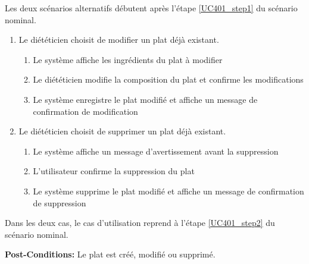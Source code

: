 Les deux scénarios alternatifs débutent après l'étape \ref{UC401_step1} du scénario nominal.
\begin{enumerate}
	\item Le diététicien choisit de modifier un plat déjà existant.
	\begin{enumerate}
		\item Le système affiche les ingrédients du plat à modifier
		\item Le diététicien modifie la composition du plat et confirme les modifications
		\item Le système enregistre le plat modifié et affiche un message de confirmation de modification
	\end{enumerate}
	\item Le diététicien choisit de supprimer un plat déjà existant.
	\begin{enumerate}
		\item Le système affiche un message d'avertissement avant la suppression
		\item L'utilisateur confirme la suppression du plat
		\item Le système supprime le plat modifié et affiche un message de confirmation de suppression
	\end{enumerate}
\end{enumerate}
Dans les deux cas, le cas d'utilisation reprend à l'étape \ref{UC401_step2} du scénario nominal.

\noindent \textbf{Post-Conditions:} Le plat est créé, modifié ou supprimé.

